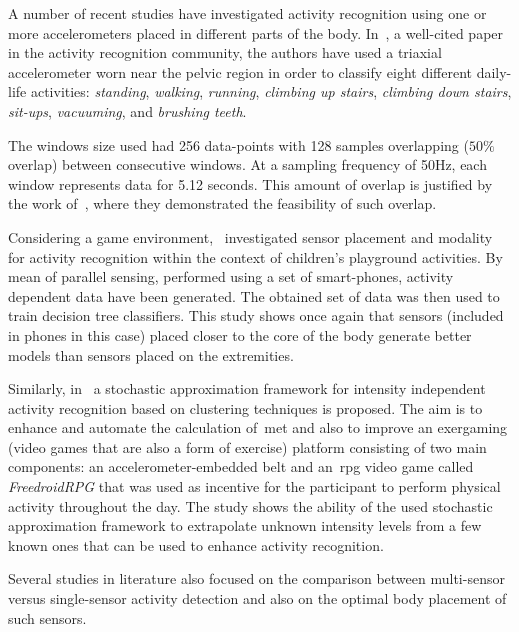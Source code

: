 A number of recent studies have investigated activity recognition using one or more accelerometers placed in different parts of the body. In~\cite{ravi_activity_2005}, a well-cited paper in the activity recognition community, the authors have used a triaxial accelerometer worn near the pelvic region in order to classify eight different daily-life activities: \textit{standing}, \textit{walking}, \textit{running}, \textit{climbing up stairs}, \textit{climbing down stairs}, \textit{sit-ups}, \textit{vacuuming}, and \textit{brushing teeth}.

The windows size used had 256 data-points with 128 samples overlapping ($50\%$ overlap) between consecutive windows. At a sampling frequency of 50Hz, each window represents data for 5.12 seconds. This amount of overlap is justified by the work of~\cite{bao_activity_2004}, where they demonstrated the feasibility of such overlap. %

Considering a game environment,~\cite{jablonsky_evaluating_2017} investigated sensor placement and modality for activity recognition within the context of children's playground  activities. By mean of parallel sensing, performed using a set of smart-phones, activity dependent data have been generated. The obtained set of data was then used to train decision tree classifiers. This study shows once again that sensors (included in phones in this case) placed closer to the core of the body generate better models than sensors placed on the  extremities. 

Similarly, in~\cite{alshurafa_designing_2014} a stochastic approximation framework for intensity independent activity recognition based on clustering techniques is proposed. The aim is to enhance and automate the calculation of~\gls{met} and also to improve an exergaming (video games that are also a form of exercise) platform consisting of two main components: an accelerometer-embedded belt and an~\gls{rpg} video game called \textit{FreedroidRPG} that was used as incentive for the participant to perform physical activity throughout the day. The study shows the ability of the used stochastic approximation framework to extrapolate unknown intensity levels from a few known ones that can be used to enhance activity recognition.

Several studies in literature also focused on the comparison between multi-sensor versus single-sensor activity detection and also on the optimal body placement of such sensors.

